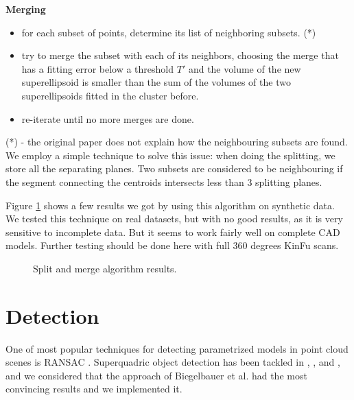 \documentclass{article}
\begin{document}
\textbf{Merging}
\begin{itemize}
	\item {for each subset of points, determine its list of neighboring subsets. (*)}
	\item {try to merge the subset with each of its neighbors, choosing the merge that has a fitting error below a threshold $T'$ and the volume of the new superellipsoid is smaller than the sum of the volumes of the two superellipsoids fitted in the cluster before.}
	\item {re-iterate until no more merges are done.}
\end{itemize}

(*) - the original paper does not explain how the neighbouring subsets are found. We employ a simple technique to solve this issue: when doing the splitting, we store all the separating planes. Two subsets are considered to be neighbouring if the segment connecting the centroids intersects less than 3 splitting planes.

Figure \ref{fig:split_merge} shows a few results we got by using this algorithm on synthetic data. We tested this technique on real datasets, but with no good results, as it is very sensitive to incomplete data. But it seems to work fairly well on complete CAD models. Further testing should be done here with full 360 degrees KinFu scans.

\begin{figure}
\centering
{}


\caption {Split and merge algorithm results.}
\label{fig:split_merge}
\end{figure}




\section {Detection}
\label{sec:detection}

One of most popular techniques for detecting parametrized models in point cloud scenes is RANSAC \cite{fischler1981random}. Superquadric object detection has been tackled in \cite{afanasyev3d}, \cite{conf/caip/KrivicS01}, and \cite{conf/icra/BiegelbauerV07}, and we considered that the approach of Biegelbauer et al. \cite{conf/icra/BiegelbauerV07} had the most convincing results and we implemented it.
\end{document}

